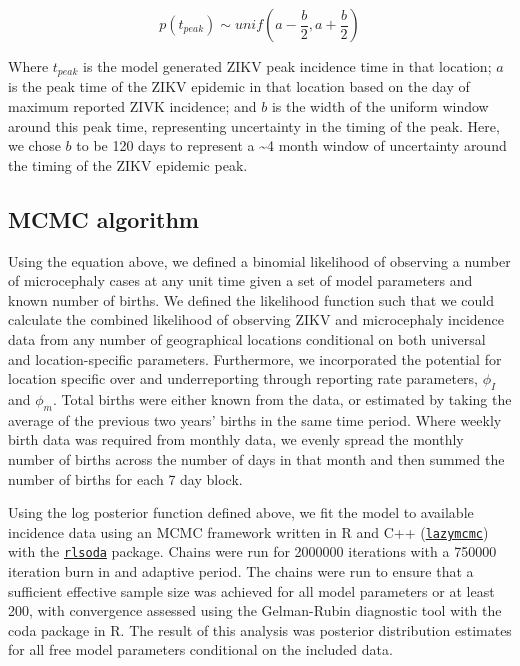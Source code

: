 \documentclass[10pt,letterpaper]{article}
\begin{document}
\begin{equation}
p(t_{peak}) \sim unif(a - \frac{b}{2},a + \frac{b}{2})
\end{equation}

Where \(t_{peak}\) is the model generated ZIKV peak incidence time in
that location; \(a\) is the peak time of the ZIKV epidemic in that
location based on the day of maximum reported ZIVK incidence; and \(b\)
is the width of the uniform window around this peak time, representing
uncertainty in the timing of the peak. Here, we chose \(b\) to be 120
days to represent a \textasciitilde{}4 month window of uncertainty
around the timing of the ZIKV epidemic peak.

\subsection{MCMC algorithm}\label{mcmc-algorithm}

Using the equation above, we defined a binomial likelihood of observing
a number of microcephaly cases at any unit time given a set of model
parameters and known number of births. We defined the likelihood
function such that we could calculate the combined likelihood of
observing ZIKV and microcephaly incidence data from any number of
geographical locations conditional on both universal and
location-specific parameters. Furthermore, we incorporated the potential
for location specific over and underreporting through reporting rate
parameters, \(\phi_I\) and \(\phi_m\). Total births were either known
from the data, or estimated by taking the average of the previous two
years' births in the same time period. Where weekly birth data was
required from monthly data, we evenly spread the monthly number of
births across the number of days in that month and then summed the
number of births for each 7 day block.

Using the log posterior function defined above, we fit the model to
available incidence data using an MCMC framework written in R and C++
(\href{https://github.com/jameshay218/lazymcmc}{\texttt{lazymcmc}}) with
the \href{https://github.com/richfitz/rlsoda}{\texttt{rlsoda}} package.
Chains were run for 2000000 iterations with a 750000 iteration burn in
and adaptive period. The chains were run to ensure that a sufficient
effective sample size was achieved for all model parameters or at least
200, with convergence assessed using the Gelman-Rubin diagnostic tool
with the coda package in R. The result of this analysis was posterior
distribution estimates for all free model parameters conditional on the
included data.
\end{document}
